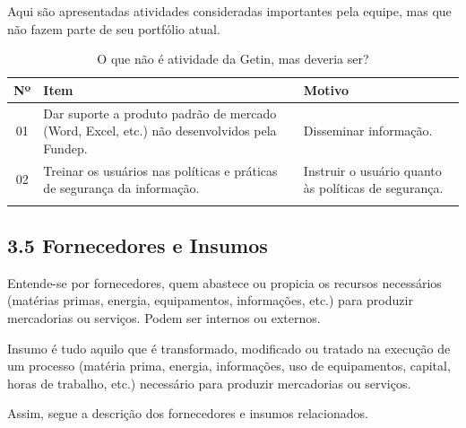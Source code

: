 \documentclass{article}
\begin{document}
Aqui são apresentadas atividades consideradas importantes pela equipe, mas que não fazem parte de seu portfólio atual.

\begin{longtable}{|c|p{6cm}|p{8cm}|}
\toprule
Nº & Item & Motivo \\
\midrule
01 & Dar suporte a produto padrão de mercado (Word, Excel, etc.) não desenvolvidos pela Fundep. & Disseminar informação. \\
02 & Treinar os usuários nas políticas e práticas de segurança da informação. & Instruir o usuário quanto às políticas de segurança. \\
\bottomrule
\caption{O que não é atividade da Getin, mas deveria ser?}
\label{tab:nao_atividade_getin_deveria_ser}
\end{longtable}

\subsection*{3.5 Fornecedores e Insumos}

Entende-se por fornecedores, quem abastece ou propicia os recursos necessários (matérias primas, energia, equipamentos, informações, etc.) para produzir mercadorias ou serviços. Podem ser internos ou externos.

Insumo é tudo aquilo que é transformado, modificado ou tratado na execução de um processo (matéria prima, energia, informações, uso de equipamentos, capital, horas de trabalho, etc.) necessário para produzir mercadorias ou serviços.

Assim, segue a descrição dos fornecedores e insumos relacionados.
\end{document}
